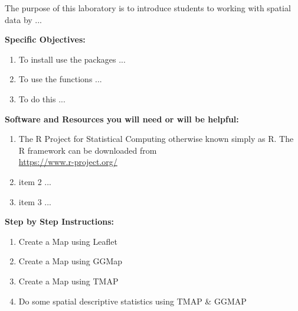 \documentclass{article}
\begin{document}
\vspace{4mm}

\setlength{\leftskip}{1cm}

\setlength{\parindent}{0cm}

The purpose of this laboratory is to introduce students to working with spatial data by ...

\vspace{4mm}

\setlength{\leftskip}{0cm}

\large{\textbf{Specific Objectives:}}

\begin{enumerate}[leftmargin=15mm]

\item To install use the packages ...

\item To use the functions ...

\item To do this ...

\end{enumerate}


\large{\textbf{Software and Resources you will need or will be helpful:}}

\begin{enumerate}[leftmargin=15mm]

\item The R Project for Statistical Computing otherwise known simply as R.  The R framework can be downloaded from \\ 
\url{https://www.r-project.org/}

\item item 2 ...

\item item 3 ...

\end{enumerate}


\large{\textbf{Step by Step Instructions:}}

\begin{enumerate}[leftmargin=15mm]

\item Create a Map using Leaflet

\item Create a Map using GGMap

\item Create a Map using TMAP

\item Do some spatial descriptive statistics using TMAP \& GGMAP

\end{enumerate}
\end{document}
